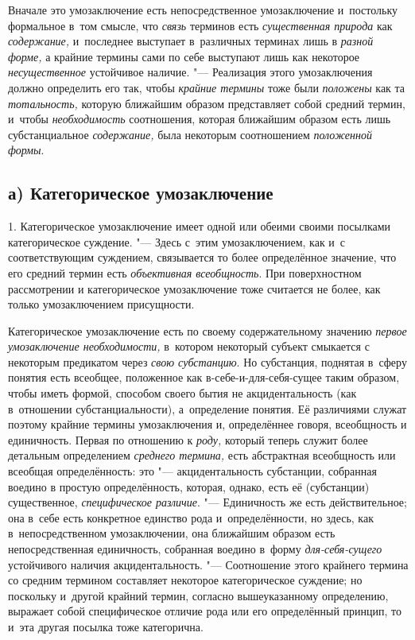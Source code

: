 Вначале это умозаключение есть непосредственное умозаключение
и~постольку формальное в~том смысле, что
{\em связь} терминов есть
{\em существенная природа}
как {\em содержание,}
и~последнее выступает в~различных терминах лишь в
{\em разной форме,} а
крайние термины сами по себе выступают лишь как некоторое
{\em несущественное}
устойчивое наличие. "--- Реализация этого
умозаключения должно определить его так, чтобы
{\em крайние термины
}тоже были
{\em положены} как та
{\em тотальность,}
которую ближайшим образом представляет собой средний термин,
и~чтобы {\em необходимость}
соотношения, которая ближайшим образом есть лишь
субстанциальное {\em содержание,}
была некоторым соотношением
{\em положенной формы}.

\subsection[а) Категорическое умозаключение]{а) Категорическое умозаключение}

1. Категорическое умозаключение имеет одной или обеими своими
посылками категорическое
суждение.
"--- Здесь с~этим умозаключением, как и~с соответствующим
суждением, связывается то более определённое значение, что
его средний термин есть {\em объективная
всеобщность}. При поверхностном рассмотрении и
категорическое умозаключение тоже считается не более, как только
умозаключением присущности.

Категорическое умозаключение есть по своему содержательному
значению {\em первое умозаключение
необходимости,} в~котором некоторый субъект смыкается с
некоторым предикатом через {\em свою
субстанцию}. Но субстанция, поднятая в~сферу понятия есть
всеобщее, положенное как в-себе-и-для-себя-сущее таким образом, чтобы иметь
формой, способом своего бытия не акцидентальность (как в~отношении
субстанциальности), а~определение понятия. Её различиями служат поэтому
крайние термины умозаключения и, определённее говоря, всеобщность и
единичность. Первая по отношению к
{\em роду,} который
теперь служит более детальным определением
{\em среднего термина,}
есть абстрактная всеобщность или всеобщая определённость:
это "--- акцидентальность субстанции, собранная воедино в
простую определённость, которая, однако, есть её (субстанции) существенное,
{\em специфическое различие}. "---
Единичность же есть действительное; она в~себе есть
конкретное единство рода и~определённости, но здесь, как в~непосредственном
умозаключении, она ближайшим образом есть непосредственная единичность,
собранная воедино в~форму
{\em для-себя-сущего}
устойчивого наличия акцидентальность. "---
Соотношение этого крайнего термина со средним термином
составляет некоторое категорическое суждение; но поскольку и~другой крайний
термин, согласно вышеуказанному определению, выражает собой специфическое
отличие рода или его определённый принцип, то и~эта другая посылка тоже
категорична.

